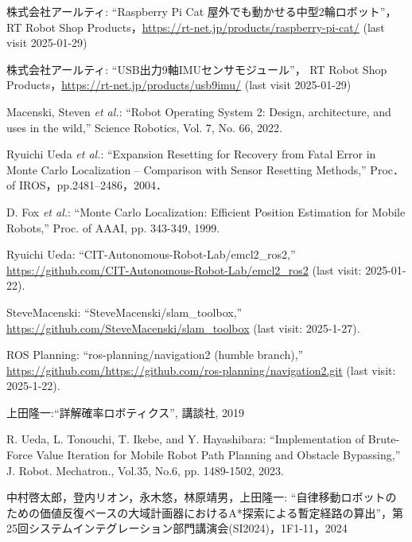 \documentclass[twocolumn,9pt]{jsproceedings}
\begin{document}
\footnotesize
\begin{thebibliography}{99}

  株式会社アールティ: ``Raspberry Pi Cat 屋外でも動かせる中型2輪ロボット''，
  RT Robot Shop Products，\url{https://rt-net.jp/products/raspberry-pi-cat/} (last visit 2025-01-29)
  
  株式会社アールティ: ``USB出力9軸IMUセンサモジュール''，
  RT Robot Shop Products，\url{https://rt-net.jp/products/usb9imu/} (last visit 2025-01-29)

  Macenski, Steven {\it et al.}: ``Robot Operating System 2: Design, architecture, and uses in the wild,''
  Science Robotics, Vol. 7, No. 66, 2022.

  Ryuichi Ueda {\it et al.}: 
  ``Expansion Resetting for Recovery from Fatal Error in Monte Carlo Localization -- Comparison with Sensor Resetting Methods,'' Proc．of IROS，pp.2481--2486，2004．
  
  D. Fox {\it et al.}: ``Monte Carlo Localization: Efficient Position Estimation for Mobile Robots,''
  Proc. of AAAI, pp. 343-349, 1999.
  
  Ryuichi Ueda: ``CIT-Autonomous-Robot-Lab/emcl2\_ros2,'' \url{https://github.com/CIT-Autonomous-Robot-Lab/emcl2_ros2} (last visit: 2025-01-22).
  
  SteveMacenski: ``SteveMacenski/slam\_toolbox,'' \url{https://github.com/SteveMacenski/slam_toolbox} (last visit: 2025-1-27).

  ROS Planning: ``ros-planning/navigation2 (humble branch),'' \url{https://github.com/https://github.com/ros-planning/navigation2.git} (last visit: 2025-1-22).

    上田隆一:``詳解確率ロボティクス'', 講談社, 2019

  R. Ueda, L. Tonouchi, T. Ikebe, and Y. Hayashibara: ``Implementation of Brute-Force Value Iteration for Mobile Robot Path Planning and Obstacle Bypassing,''
  J. Robot. Mechatron., Vol.35, No.6, pp. 1489-1502, 2023.

    中村啓太郎，登内リオン，永木悠，林原靖男，上田隆一: ``自律移動ロボットのための価値反復ベースの大域計画器におけるA*探索による暫定経路の算出''，第25回システムインテグレーション部門講演会(SI2024)，1F1-11，2024


\end{thebibliography}
\end{document}
